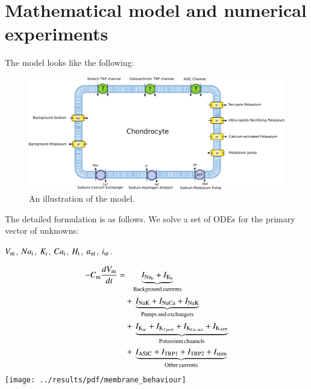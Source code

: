 \section{Mathematical model and numerical experiments}
\label{model}

The model looks like the following:

\begin{figure}
  \centering
  \includegraphics[width=\textwidth]{../images/pdf/chondrocyte-model-cellml}
  \caption{An illustration of the model.}
  \label{fig:chondrocyte-model}
\end{figure}

The detailed formulation is as follows. We solve a set of ODEs for the primary vector of unknowns:

$V_{\rm m}$, $Na_{\rm i}$, $K_{\rm i}$, $Ca_{\rm i}$, $H_{\rm i}$,
$a_{\rm ur}$, $i_{\rm ur}$.


\begin{displaymath}
    \begin{split}
      -C_{\rm m} \frac{dV_{\rm m}}{dt} = & \phantom{+\,} \underbrace{I_{\rm Na_b} + I_{\rm K_b}}_{\rm Background\, currents}\\
      & +\, \underbrace{I_{\rm NaK} + I_{\rm NaCa} + I_{\rm NaK}}_{\rm Pumps\, and\, exchangers}\\
      & +\, \underbrace{I_{\rm K_{ur}} + I_{\rm K_{2\, pore}} + I_{\rm K_{Ca-act}} + I_{\rm K_{ATP}}}_{\rm Potassium\, channels}\\
      & +\, \underbrace{I_{\rm ASIC} + I_{\rm TRP1} + I_{\rm TRP2} + I_{\rm stim}}_{\rm Other\, currents}
    \end{split}
\end{displaymath}
\centering
\texttt{[image: ../results/pdf/membrane\_behaviour]}


